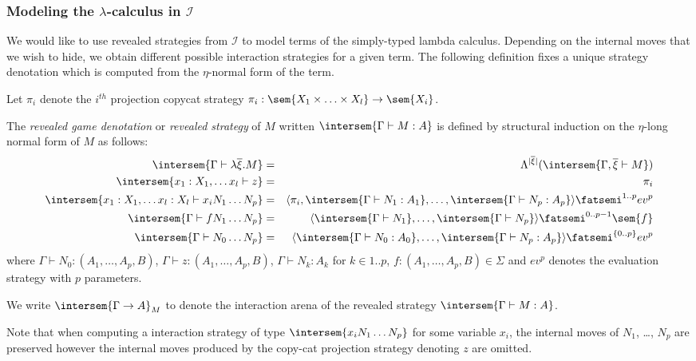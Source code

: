 \subsubsection{Modeling the $\lambda$-calculus in $\mathcal{I}$}

We would like to use revealed strategies from $\mathcal{I}$ to model terms of
the simply-typed lambda calculus.
Depending on the internal moves that we wish to hide, we obtain different possible interaction strategies for a given term.
The following definition fixes a unique strategy denotation which is computed from the $\eta$-normal form of the term.

\begin{dfn}
\label{dfn:interactionstrategy_ofterms}
Let $\pi_i$ denote the $i^{th}$ projection copycat strategy $\pi_i : \sem{X_1 \times \ldots \times X_l} \rightarrow \sem{X_i}$.

The \emph{revealed game denotation} or \emph{revealed
strategy} of $M$ written $\intersem{\Gamma \vdash M : A}$ is defined by structural induction on the $\eta$-long normal form of $M$ as follows:
\begin{eqnarray*}
\intersem{\Gamma \vdash \lambda \overline{\xi} . M } &=& \Lambda^{|\overline{\xi}|}(\intersem{\Gamma, \overline{\xi} \vdash M })  \\
\intersem{x_1 : X_1, \ldots x_l \vdash z } &=& \pi_i  \\
\intersem{x_1 : X_1, \ldots x_l : X_l \vdash x_i N_1 \ldots N_p} &=& \langle \pi_i, \intersem{\Gamma \vdash N_1 : A_1}, \ldots, \intersem{\Gamma \vdash N_p : A_p}  \rangle \fatsemi ^{1..p} ev^p \\
\intersem{\Gamma \vdash f N_1 \ldots N_p} &=& \langle \intersem{\Gamma \vdash N_1}, \ldots, \intersem{\Gamma \vdash N_p} \rangle \fatsemi^{0..p-1} \sem{f} \\
\intersem{\Gamma \vdash N_0 \ldots N_p} &=& \langle \intersem{\Gamma \vdash N_0 : A_0}, \ldots, \intersem{\Gamma \vdash N_p : A_p}  \rangle \fatsemi^{\{0..p\}} ev^p
\end{eqnarray*}
where $\Gamma \vdash N_0 : (A_1,\ldots,A_p,B)$, $\Gamma \vdash z : (A_1,\ldots,A_p,B)$, $\Gamma \vdash N_k : A_k$ for $k\in 1..p$,
$f : (A_1,\ldots,A_p,B) \in \Sigma$ and $ev^p$ denotes the evaluation strategy with $p$ parameters.

We write $\intersem{\Gamma \rightarrow A}_M$ to denote the
interaction arena of the revealed strategy $\intersem{\Gamma \vdash
M : A}$.
\end{dfn}
Note that when computing a interaction strategy of type $\intersem{x_i N_1 \ldots N_p}$ for some variable $x_i$, the internal moves of $N_1$, \ldots, $N_p$ are preserved however the internal moves produced by the copy-cat projection strategy denoting $z$ are omitted.

